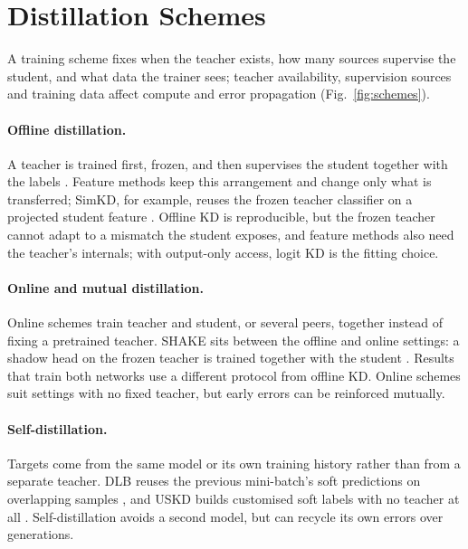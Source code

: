 \section{Distillation Schemes}
\label{sec:schemes}

A training scheme fixes when the teacher exists, how many sources supervise the student, and what data the trainer sees; teacher availability, supervision sources and training data affect compute and error propagation (Fig.~\ref{fig:schemes}).



\paragraph{Offline distillation.} A teacher is trained first, frozen, and then supervises the student together with the labels \citep{hinton2015kd}. Feature methods keep this arrangement and change only what is transferred; SimKD, for example, reuses the frozen teacher classifier on a projected student feature \citep{chen2022simkd}. Offline KD is reproducible, but the frozen teacher cannot adapt to a mismatch the student exposes, and feature methods also need the teacher's internals; with output-only access, logit KD is the fitting choice.

\paragraph{Online and mutual distillation.} Online schemes train teacher and student, or several peers, together instead of fixing a pretrained teacher. SHAKE sits between the offline and online settings: a shadow head on the frozen teacher is trained together with the student \citep{li2022shake}. Results that train both networks use a different protocol from offline KD. Online schemes suit settings with no fixed teacher, but early errors can be reinforced mutually.

\paragraph{Self-distillation.} Targets come from the same model or its own training history rather than from a separate teacher. DLB reuses the previous mini-batch's soft predictions on overlapping samples \citep{shen2022dlb}, and USKD builds customised soft labels with no teacher at all \citep{yang2023nkd}. Self-distillation avoids a second model, but can recycle its own errors over generations.

